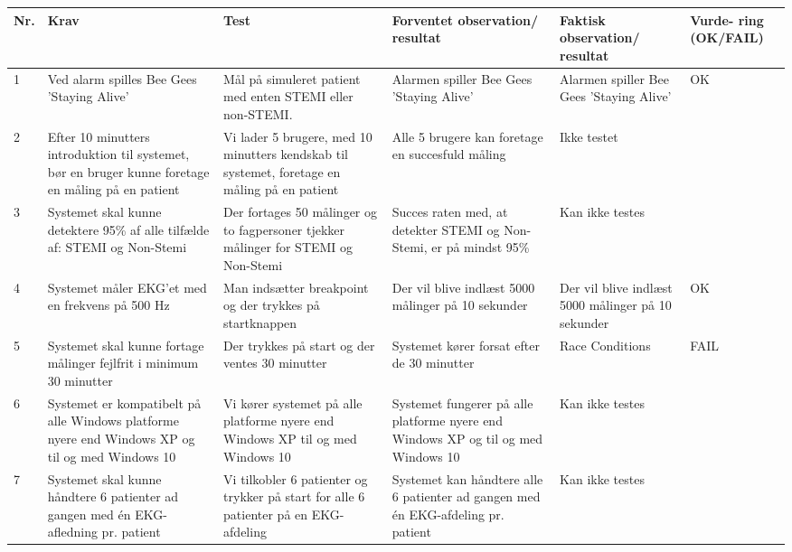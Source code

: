 \begin{table}[H]
\begin{tabular}{|p{0.5cm}|p{4cm}|p{3cm}|p{3cm}|p{3cm}|p{1cm}|}
\hline
\textbf{Nr.} & \textbf{Krav} & \textbf{Test}& \textbf{Forventet observation/ resultat}& \textbf{Faktisk observation/ resultat}& \textbf{Vurde- ring (OK/FAIL)}\\\hline
 1 & Ved alarm spilles Bee Gees 'Staying Alive' & Mål på simuleret patient med enten STEMI eller non-STEMI. & Alarmen spiller Bee Gees 'Staying Alive' & Alarmen spiller Bee Gees 'Staying Alive' & OK\\\hline
 2 & Efter 10 minutters introduktion til systemet, bør en bruger kunne foretage en måling på en patient & Vi lader 5 brugere, med 10 minutters kendskab til systemet, foretage en måling på en patient & Alle 5 brugere kan foretage en succesfuld måling & Ikke testet &  \\\hline
 3 & Systemet skal kunne detektere 95\% af alle tilfælde af: STEMI og Non-Stemi & Der fortages 50 målinger og to fagpersoner tjekker målinger for STEMI og Non-Stemi & Succes raten med, at detekter STEMI og Non-Stemi, er på mindst 95\% & Kan ikke testes & \\\hline
 4 & Systemet måler EKG'et med en frekvens på 500 Hz & Man indsætter breakpoint og der trykkes på startknappen & Der vil blive indlæst 5000 målinger på 10 sekunder & Der vil blive indlæst 5000 målinger på 10 sekunder & OK \\\hline
 5 & Systemet skal kunne fortage målinger fejlfrit i minimum 30 minutter & Der trykkes på start og der ventes 30 minutter & Systemet kører forsat efter de 30 minutter & Race Conditions & FAIL \\\hline
 6 & Systemet er kompatibelt på alle Windows platforme nyere end Windows XP og til og med Windows 10 & Vi kører systemet på alle platforme nyere end Windows XP til og med Windows 10 & Systemet fungerer på alle platforme nyere end Windows XP og til og med Windows 10 & Kan ikke testes & \\\hline
 7 & Systemet skal kunne håndtere 6 patienter ad gangen med én EKG-afledning pr. patient & Vi tilkobler 6 patienter og trykker på start for alle 6 patienter på en EKG-afdeling & Systemet kan håndtere alle 6 patienter ad gangen med én EKG-afdeling pr. patient & Kan ikke testes&  \\\hline
\end{tabular}
\end{table}
